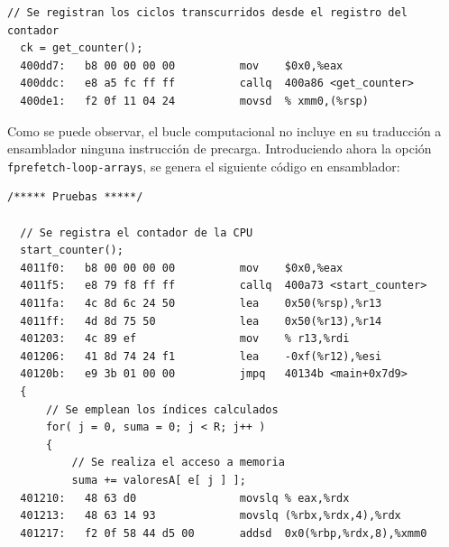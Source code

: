 \documentclass[conference]{IEEEtran}
\begin{document}
\begin{lstlisting}[style=customasm, basicstyle=\scriptsize, title=Traducción a ensamblador del bucle computacional del programa de pruebas sin incluir la precarga mediante software.]
  // Se registran los ciclos transcurridos desde el registro del contador
  ck = get_counter();
  400dd7:	b8 00 00 00 00       	mov    $0x0,%eax
  400ddc:	e8 a5 fc ff ff       	callq  400a86 <get_counter>
  400de1:	f2 0f 11 04 24       	movsd  % xmm0,(%rsp)
\end{lstlisting}

Como se puede observar, el bucle computacional no incluye en su traducción a ensamblador ninguna instrucción de precarga. Introduciendo ahora la opción \texttt{fprefetch-loop-arrays}, se genera el siguiente código en ensamblador:

\begin{lstlisting}[style=customasm, basicstyle=\scriptsize, title=Traducción a ensamblador del bucle computacional del programa de pruebas incluyendo la precarga mediante software.]
/***** Pruebas *****/

  // Se registra el contador de la CPU
  start_counter();
  4011f0:	b8 00 00 00 00       	mov    $0x0,%eax
  4011f5:	e8 79 f8 ff ff       	callq  400a73 <start_counter>
  4011fa:	4c 8d 6c 24 50       	lea    0x50(%rsp),%r13
  4011ff:	4d 8d 75 50          	lea    0x50(%r13),%r14
  401203:	4c 89 ef             	mov    % r13,%rdi
  401206:	41 8d 74 24 f1       	lea    -0xf(%r12),%esi
  40120b:	e9 3b 01 00 00       	jmpq   40134b <main+0x7d9>
  {
      // Se emplean los índices calculados
      for( j = 0, suma = 0; j < R; j++ )
      {
          // Se realiza el acceso a memoria
          suma += valoresA[ e[ j ] ];
  401210:	48 63 d0             	movslq % eax,%rdx
  401213:	48 63 14 93          	movslq (%rbx,%rdx,4),%rdx
  401217:	f2 0f 58 44 d5 00    	addsd  0x0(%rbp,%rdx,8),%xmm0


\end{lstlisting}
\end{document}
